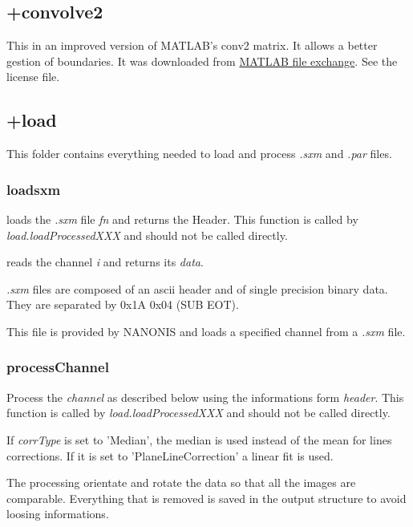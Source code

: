 \edf
\subsection{+convolve2}
This in an improved version of MATLAB's conv2 matrix. It allows a better gestion of boundaries. 
It was downloaded from \href{http://www.mathworks.com/matlabcentral/fileexchange/22619-fast-2-d-convolution}{MATLAB file exchange}. See the license file.

\subsection{+load}
This folder contains everything needed to load and process \emph{.sxm} and \emph{.par} files.

\subsubsection{loadsxm}
\bdf

 loads the \emph{.sxm} file \emph{fn} and returns the Header. This function is called by \emph{load.loadProcessedXXX} and should not be called directly.

 reads the channel \emph{i} and returns its \emph{data}.

\edf

\emph{.sxm} files are composed of an ascii header and of single precision binary data. They are separated by 0x1A 0x04 (SUB EOT).

This file is provided by NANONIS and loads a specified channel from a \emph{.sxm} file.

\subsubsection{processChannel}

\bdf
{} Process the \emph{channel} as described below using the informations form \emph{header}. This function is called by \emph{load.loadProcessedXXX} and should not be called directly.

 If \emph{corrType} is set to 'Median', the median is used instead of the mean for lines corrections. If it is set to 'PlaneLineCorrection' a linear fit is used.  
\edf

The processing orientate and rotate the data so that all the images are comparable.
Everything that is removed is saved in the output structure to avoid loosing informations.

